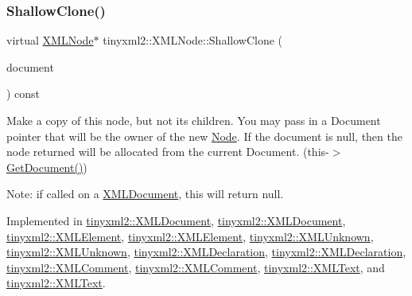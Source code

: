 \mbox{\label{classtinyxml2_1_1XMLNode_a8402cbd3129d20e9e6024bbcc0531283}} 
\subsubsection{\texorpdfstring{Shallow\+Clone()}{ShallowClone()}\hspace{0.1cm}{\footnotesize\ttfamily [2/2]}}
{\footnotesize\ttfamily virtual \hyperlink{classtinyxml2_1_1XMLNode}{X\+M\+L\+Node}$\ast$ tinyxml2\+::\+X\+M\+L\+Node\+::\+Shallow\+Clone (\begin{DoxyParamCaption}\item[{\hyperlink{classtinyxml2_1_1XMLDocument}{X\+M\+L\+Document} $\ast$}]{document }\end{DoxyParamCaption}) const\hspace{0.3cm}{\ttfamily [pure virtual]}}

Make a copy of this node, but not its children. You may pass in a Document pointer that will be the owner of the new \hyperlink{classNode}{Node}. If the \textquotesingle{}document\textquotesingle{} is null, then the node returned will be allocated from the current Document. (this-\/$>$\hyperlink{classtinyxml2_1_1XMLNode_af343d1ef0b45c0020e62d784d7e67a68}{Get\+Document()})

Note\+: if called on a \hyperlink{classtinyxml2_1_1XMLDocument}{X\+M\+L\+Document}, this will return null. 

Implemented in \hyperlink{classtinyxml2_1_1XMLDocument_aa37cc1709d7e1e988bc17dcfb24a69b8}{tinyxml2\+::\+X\+M\+L\+Document}, \hyperlink{classtinyxml2_1_1XMLDocument_aa37cc1709d7e1e988bc17dcfb24a69b8}{tinyxml2\+::\+X\+M\+L\+Document}, \hyperlink{classtinyxml2_1_1XMLElement_ac035742d68b0c50c3f676374e59fe750}{tinyxml2\+::\+X\+M\+L\+Element}, \hyperlink{classtinyxml2_1_1XMLElement_aafa2807a45b28fe096b29d76e6a13b7c}{tinyxml2\+::\+X\+M\+L\+Element}, \hyperlink{classtinyxml2_1_1XMLUnknown_a0125f41c89763dea06619b5fd5246b4c}{tinyxml2\+::\+X\+M\+L\+Unknown}, \hyperlink{classtinyxml2_1_1XMLUnknown_ab73b48b819aa4b2ef3815dc2d7d20d5f}{tinyxml2\+::\+X\+M\+L\+Unknown}, \hyperlink{classtinyxml2_1_1XMLDeclaration_a118d47518dd9e522644e42efa259aed7}{tinyxml2\+::\+X\+M\+L\+Declaration}, \hyperlink{classtinyxml2_1_1XMLDeclaration_ad9d60e6d2df75c13eb6bf7319985b747}{tinyxml2\+::\+X\+M\+L\+Declaration}, \hyperlink{classtinyxml2_1_1XMLComment_a08991cc63fadf7e95078ac4f9ea1b073}{tinyxml2\+::\+X\+M\+L\+Comment}, \hyperlink{classtinyxml2_1_1XMLComment_adf5b5c0319351dcc339df098d11e8fb2}{tinyxml2\+::\+X\+M\+L\+Comment}, \hyperlink{classtinyxml2_1_1XMLText_af3a81ed4dd49d5151c477b3f265a3011}{tinyxml2\+::\+X\+M\+L\+Text}, and \hyperlink{classtinyxml2_1_1XMLText_a86d265c93152726c8c6831e9594840e6}{tinyxml2\+::\+X\+M\+L\+Text}.

